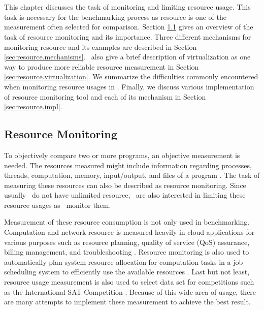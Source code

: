 \chapter{\chResource}
\label{ch:resource}

This chapter discusses the task of monitoring and limiting resource usage.
This task is necessary for the benchmarking process as resource is one of the measurement often selected for comparison.
Section \ref{sec:resource.overview} gives an overview of the task of resource monitoring and its importance.
Three different mechanisms for monitoring resource and its examples are described in Section \ref{sec:resource.mechanisms}.
\First~also give a brief description of virtualization as one way to produce more reliable resource measurement in Section \ref{sec:resource.virtualization}.
We summarize the difficulties commonly encountered when monitoring resource usages in .
Finally, we discuss various implementation of resource monitoring tool and each of its mechanism in Section \ref{sec:resource.impl}.

\section{Resource Monitoring}
\label{sec:resource.overview}

To objectively compare two or more programs, an objective measurement is needed.
The resources measured might include information regarding processes, threads, computation, memory, input/output, and files of a program \citep{juvePracticalResourceMonitoring2015}.
The task of measuring these resources can also be described as resource monitoring.
Since usually \first~do not have unlimited resource, \first~are also interested in limiting these resource usages as \first~monitor them.

Measurement of these resource consumption is not only used in benchmarking.
Computation and network resource is measured heavily in cloud applications for various purposes such as resource planning, quality of service (QoS) assurance, billing management, and troubleshooting \citep{aceto2013cloud}.
Resource monitoring is also used to automatically plan system resource allocation for computation tasks in a job scheduling system to efficiently use the available resources \citep{tovarJobSizingStrategy2018}.
Last but not least, resource usage measurement is also used to select data set for competitions such as the International SAT Competition \citep{heule2018proceedings}.
Because of this wide area of usage, there are many attempts to implement these measurement to achieve the best result.

